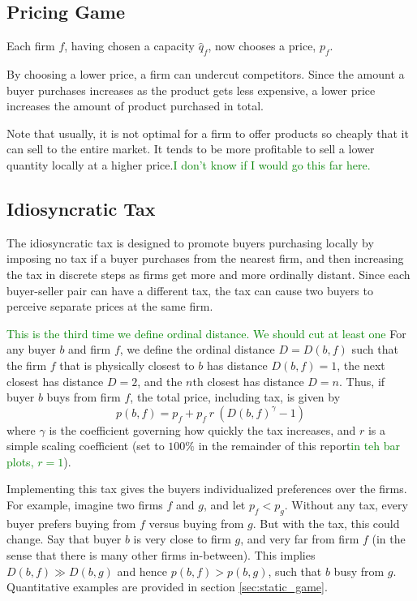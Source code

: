 \documentclass[final,3p,times,authoryear,12pt]{elsarticle}
\newcommand{\green}[1]{\textcolor{Green}{#1}} %
\begin{document}
\subsection{Pricing Game}

Each firm $f$, having chosen a capacity $\hat q_f$, now chooses a price, $p_f$. 

By choosing a lower price, a firm can undercut competitors. 
Since the amount a buyer purchases increases as the product gets less expensive, a lower price increases the amount of product purchased in total. 

Note that usually, it is not optimal for a firm to offer products so cheaply that it can sell to the entire market. 
It tends to be more profitable to sell a lower quantity locally at a higher price.\green{I don't know if I would go this far here.}

\subsection{Idiosyncratic Tax}
The idiosyncratic tax is designed to promote buyers purchasing locally by
imposing no tax if a buyer purchases from the nearest firm, and then increasing
the tax in discrete steps as firms get more and more ordinally distant. Since
each buyer-seller pair can have a different tax, the tax can cause two buyers
to perceive separate prices at the same firm.

\green{This is the third time we define ordinal distance. We should cut at least
one}
For any buyer $b$ and firm $f$, we define the ordinal distance $D = D(b,f)$
such that the firm $f$ that is physically closest to $b$ has distance
$D(b,f)=1$, the next closest has distance $D=2$, and the $n$th closest has
distance $D=n$.  Thus, if buyer $b$ buys from firm $f$, the total price,
including tax, is given by 
\begin{equation}
	p(b,f) = p_f + p_f ~ r~ \left( D(b,f)^\gamma - 1 \right)
\end{equation}
where $\gamma$ is the coefficient governing how quickly the tax increases, and
$r$ is a simple scaling coefficient (set to $100\%$ in the remainder of this
report\green{in teh bar plots, $r=1$}). 

Implementing this tax gives the buyers individualized preferences over the firms. 
For example, imagine two firms $f$ and $g$, and let $p_f <p_g$. 
Without any tax, every buyer prefers buying from $f$ versus buying from $g$. 
But with the tax, this could change. 
Say that buyer $b$ is very close to firm $g$, and very far from firm $f$ (in the sense that there is many other firms in-between). 
This implies $D(b,f) \gg D(b,g)$ and hence $p(b,f) > p(b,g)$, such that $b$ busy from $g$. 
Quantitative examples are provided in section \ref{sec:static_game}. 
\end{document}
